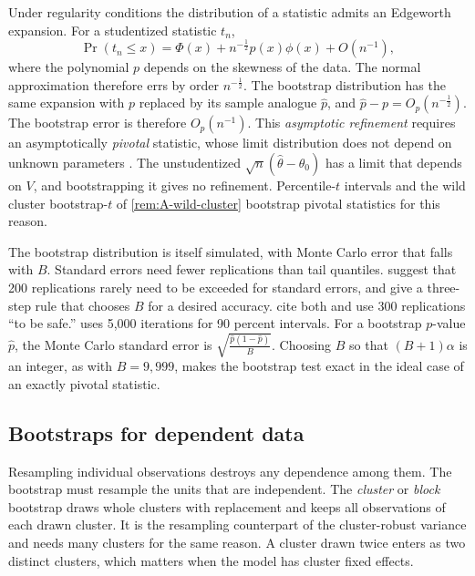 Under regularity conditions the distribution of a statistic admits an Edgeworth expansion. For a
studentized statistic $t_n$,
\begin{equation*}
  \Pr(t_n \le x) = \Phi(x) + n^{-\frac{1}{2}}p(x)\phi(x) + O(n^{-1}),
\end{equation*}
where the polynomial $p$ depends on the skewness of the data. The normal approximation therefore errs by order
$n^{-\frac{1}{2}}$. The bootstrap distribution has the same expansion with $p$ replaced by its sample analogue
$\hat p$, and $\hat p - p = O_p(n^{-\frac{1}{2}})$. The bootstrap error is therefore $O_p(n^{-1})$. This
\emph{asymptotic refinement} requires an asymptotically \emph{pivotal} statistic, whose limit distribution does not
depend on unknown parameters \citep{Hall1992,Horowitz2001}. The unstudentized $\sqrt n(\hat\theta - \theta_0)$ has a
limit that depends on $V$, and bootstrapping it gives no refinement. Percentile-$t$ intervals and the wild cluster
bootstrap-$t$ of \cref{rem:A-wild-cluster} bootstrap pivotal statistics for this reason.

The bootstrap distribution is itself simulated, with Monte Carlo error that falls with $B$. Standard errors need
fewer replications than tail quantiles. \citet{EfronTibshirani1993} suggest that 200 replications rarely need to be
exceeded for standard errors, and \citet{AndrewsBuchinsky2000} give a three-step rule that chooses $B$ for a desired
accuracy. \citet[WP p.~21]{ChaudhuriGoldbergJia2006} cite both and use 300 replications ``to be safe.''
\citet{Asker2010} uses 5,000 iterations for 90 percent intervals. For a bootstrap $p$-value $\hat p$, the Monte
Carlo standard error is $\sqrt{\frac{\hat p(1 - \hat p)}{B}}$. Choosing $B$ so that $(B + 1)\alpha$ is an integer,
as with $B = 9{,}999$, makes the bootstrap test exact in the ideal case of an exactly pivotal statistic.

\subsection{Bootstraps for dependent data}\label{sec:A-boot-dependent}

Resampling individual observations destroys any dependence among them. The bootstrap must resample the units that
are independent. The \emph{cluster} or \emph{block} bootstrap draws whole clusters with replacement and keeps all
observations of each drawn cluster. It is the resampling counterpart of the cluster-robust variance and needs many
clusters for the same reason. A cluster drawn twice enters as two distinct clusters, which matters when the model
has cluster fixed effects.


